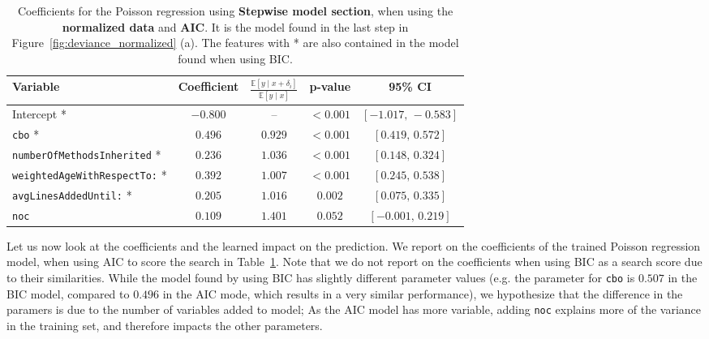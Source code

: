 


\begin{table}[htbp]
    \centering
    \begin{tabular}{l c c c c}
        \toprule
        \textbf{Variable} & \textbf{Coefficient} & $\frac{\mathbb{E}[y\mid x+\delta_i]}{\mathbb{E}[y\mid x]}$ & \textbf{p-value} & \textbf{95\% CI} \\
        \midrule
        Intercept * & $-0.800$ & -- & $<0.001$ & $[-1.017,\,-0.583]$ \\
        \texttt{cbo} * & $0.496$ & $0.929$ & $<0.001$ & $[0.419,\,0.572]$ \\
        \texttt{numberOfMethodsInherited} * & $0.236$ & $1.036$ & $<0.001$ & $[0.148,\,0.324]$ \\
        \texttt{weightedAgeWithRespectTo:} * & $0.392$ & $1.007$ & $<0.001$ & $[0.245,\,0.538]$ \\
        \texttt{avgLinesAddedUntil:} * & $0.205$ & $1.016$ & $0.002$ & $[0.075,\,0.335]$ \\
        \texttt{noc} & $0.109$ & $1.401$ & $0.052$ & $[-0.001,\,0.219]$ \\
        \bottomrule
    \end{tabular}
    \caption{Coefficients for the Poisson regression using \textbf{Stepwise model section}, when using the \textbf{normalized data} and \textbf{AIC}. It is the model found in the last step in Figure~\ref{fig:deviance_normalized} (a). The features with * are also contained in the model found when using BIC.}
    \label{tab:coefficients_poisson_stepwise_normalized}
\end{table}

Let us now look at the coefficients and the learned impact on the prediction. We report on the coefficients of the trained Poisson regression model, when using AIC to score the search in Table~\ref{tab:coefficients_poisson_stepwise_normalized}. Note that we do not report on the coefficients when using BIC as a search score due to their similarities. While the model found by using BIC has slightly different parameter values (e.g. the parameter for \texttt{cbo} is $0.507$ in the BIC model, compared to $0.496$ in the AIC mode, which results in a very similar performance), we hypothesize that the difference in the paramers is due to the number of variables added to model; As the AIC model has more variable, adding \texttt{noc} explains more of the variance in the training set, and therefore impacts the other parameters.

